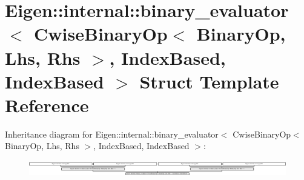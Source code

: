 \hypertarget{struct_eigen_1_1internal_1_1binary__evaluator_3_01_cwise_binary_op_3_01_binary_op_00_01_lhs_00_009c1543c08828196fc8ade7d79a56c66}{}\section{Eigen\+:\+:internal\+:\+:binary\+\_\+evaluator$<$ Cwise\+Binary\+Op$<$ Binary\+Op, Lhs, Rhs $>$, Index\+Based, Index\+Based $>$ Struct Template Reference}
\label{struct_eigen_1_1internal_1_1binary__evaluator_3_01_cwise_binary_op_3_01_binary_op_00_01_lhs_00_009c1543c08828196fc8ade7d79a56c66}
Inheritance diagram for Eigen\+:\+:internal\+:\+:binary\+\_\+evaluator$<$ Cwise\+Binary\+Op$<$ Binary\+Op, Lhs, Rhs $>$, Index\+Based, Index\+Based $>$\+:\begin{figure}[H]
\begin{center}
\leavevmode
\includegraphics[height=0.701169cm]{struct_eigen_1_1internal_1_1binary__evaluator_3_01_cwise_binary_op_3_01_binary_op_00_01_lhs_00_009c1543c08828196fc8ade7d79a56c66}
\end{center}
\end{figure}
